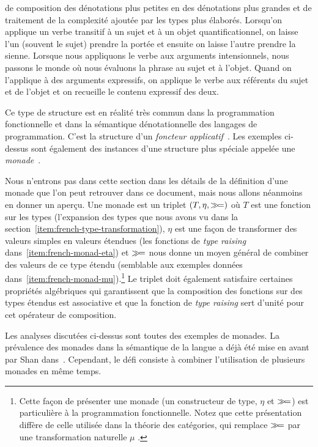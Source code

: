 \begin{enumerate}
  de composition des dénotations plus petites en des dénotations plus grandes
  et de traitement de la complexité ajoutée par les types plus élaborés. Lorsqu'on
  applique un verbe transitif à un sujet et à un objet quantificationnel, on
  laisse l'un (souvent le sujet) prendre la portée et ensuite on laisse l'autre
  prendre la sienne. Lorsque nous appliquons le verbe aux arguments
  intensionnels, nous passons le monde où nous évaluons la phrase au sujet et
  à l'objet. Quand on l'applique à des arguments expressifs, on applique le verbe
  aux référents du sujet et de l'objet et on recueille le contenu expressif des deux.
\end{enumerate}

Ce type de structure est en réalité très commun dans la programmation fonctionnelle et dans
la sémantique dénotationnelle des langages de programmation. C'est la structure
d'un \emph{foncteur applicatif}~\cite{mcbride2008applicative}. Les exemples
ci-dessus sont également des instances d'une structure plus spéciale appelée une
\emph{monade}~\cite{moggi1991notions}.

Nous n'entrons pas dans cette section dans les détails de la définition d'une monade que l'on peut retrouver dans ce document,
mais nous allons néanmoins en donner un aperçu. Une monade est un triplet $(T, \eta,
\mathbin{\gg\!=})$ où $T$ est une fonction sur les types (l'expansion des types que nous
avons vu dans la section~\ref{item:french-type-transformation}), $\eta$ est une façon de
transformer des valeurs simples en valeurs étendues (les fonctions de \textit{type raising}
dans~\ref{item:french-monad-eta}) et $\mathbin{\gg\!=}$ nous donne un moyen général de
combiner des valeurs de ce type étendu (semblable aux exemples données
dans~\ref{item:french-monad-mu}).\footnote{Cette façon de présenter une monade (un
  constructeur de type, $\eta$ et $\mathbin{\gg\!=}$) est particulière à la programmation
  fonctionnelle. Notez que cette présentation diffère de celle utilisée dans la
  théorie des catégories, qui remplace $\mathbin{\gg\!=}$ par une transformation
  naturelle $\mu$ \cite{mac1978categories}.} Le triplet doit également satisfaire
certaines propriétés algébriques qui garantissent que la composition des
fonctions sur des types étendus est associative et que la fonction de \emph{type raising}
sert d'unité pour cet opérateur de composition.

Les analyses discutées ci-dessus sont toutes des exemples de monades. La
prévalence des monades dans la sémantique de la langue a déjà été
mise en avant par Shan dans~\cite{shan2002monads}. Cependant, le défi consiste à
combiner l'utilisation de plusieurs monades en même temps.


